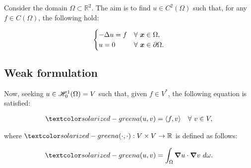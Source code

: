 Consider the domain $\Omega \subset \mathbb{R}^2$. The aim is to find $u \in C^2(\Omega)$ such that, for any $f \in C(\Omega)$, the following hold:

\begin{gather}
    \begin{cases} \label{strong_stokes}
        - \Delta u = f & \forall ~ \bm{x} \in \Omega, \\
        u = 0 & \forall ~ \bm{x} \in \partial \Omega.
    \end{cases}
\end{gather}

\subsection{Weak formulation}

Now, seeking $u \in \mathscr{H}^1_0(\Omega) = V$ such that, given $f \in V^*$, the following equation is satisfied:

\begin{gather} \label{weak_stokes}
    \boa{u}{v} = \langle f, v \rangle \quad \Forall v \in V,
\end{gather}

where $\boa{\cdot}{\cdot}: V \times V \rightarrow \mathbb{R}$ is defined as follows:

\begin{gather}
    \boa{u}{v} = \int_{\Omega} \grad u \cdot \grad v ~ d \omega. \label{a}
\end{gather}